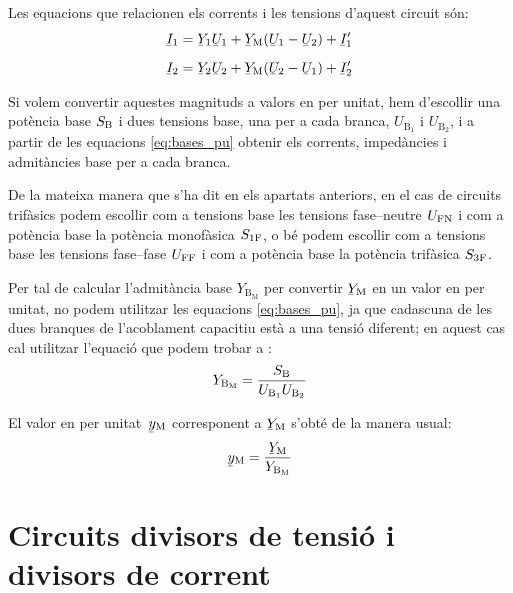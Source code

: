 \begin{center}
    
    \label{pic:pu_ym}
\end{center}

Les equacions que relacionen els corrents i les tensions d'aquest circuit són:
\begin{subequations}
\begin{align}
    \cmplx{I}_1  &= \cmplx{Y}_1 \cmplx{U}_1 +  \cmplx{Y}\ped{M}(\cmplx{U}_1-\cmplx{U}_2)  + \cmplx{I}'_1   \\[2mm]
    \cmplx{I}_2  &= \cmplx{Y}_2 \cmplx{U}_2 +  \cmplx{Y}\ped{M}(\cmplx{U}_2-\cmplx{U}_1)  + \cmplx{I}'_2
\end{align}
\end{subequations}

Si volem convertir aquestes magnituds a valors en per unitat, hem d'escollir  una potència base $S_\mathrm{B}$ i dues tensions base, una  per a cada branca, $U_{\text{B}_1}$ i  $U_{\text{B}_2}$, i a partir de les equacions \eqref{eq:bases_pu} obtenir els corrents, impedàncies i admitàncies base per a cada branca.

De la mateixa manera que s'ha dit en els apartats anteriors, en el cas de circuits trifàsics podem escollir com a tensions base les tensions fase--neutre $U_\mathrm{FN}$ i com a potència base la potència  monofàsica $S_\mathrm{1F}$, o bé podem escollir com a tensions base les tensions fase--fase $U_\mathrm{FF}$ i com a potència base la potència trifàsica $S_\mathrm{3F}$.


Per tal de  calcular l'admitància base $Y_{\text{B}_\text{M}}$ per convertir $\cmplx{Y}\ped{M}$ en un valor en per unitat, no podem utilitzar les equacions \eqref{eq:bases_pu}, ja que cadascuna de les dues branques de l'acoblament capacitiu està a una tensió diferent; en aquest cas cal utilitzar l'equació que podem trobar a \cite{TLE}:
\begin{equation}
    Y_{\text{B}_\text{M}} = \frac{S_\mathrm{B}}{U_{\text{B}_1} U_{\text{B}_2}}
\end{equation}

El valor en per unitat\ $\cmplx{y}\ped{M}$ corresponent a $\cmplx{Y}\ped{M}$ s'obté de la manera usual:
\begin{equation}
    \cmplx{y}\ped{M} = \frac{\cmplx{Y}\ped{M}}{Y_{\text{B}_\text{M}}}
\end{equation}


\section{Circuits divisors de tensió i divisors de corrent}\label{sec:div_tens_corr}

